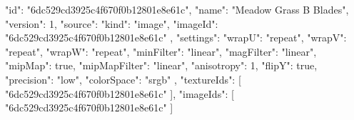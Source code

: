 {
  "id": "6dc529cd3925c4f670f0b12801e8e61c",
  "name": "Meadow Grass B Blades",
  "version": 1,
  "source": {
    "kind": "image",
    "imageId": "6dc529cd3925c4f670f0b12801e8e61c"
  },
  "settings": {
    "wrapU": "repeat",
    "wrapV": "repeat",
    "wrapW": "repeat",
    "minFilter": "linear",
    "magFilter": "linear",
    "mipMap": true,
    "mipMapFilter": "linear",
    "anisotropy": 1,
    "flipY": true,
    "precision": "low",
    "colorSpace": "srgb"
  },
  "textureIds": [
    "6dc529cd3925c4f670f0b12801e8e61c"
  ],
  "imageIds": [
    "6dc529cd3925c4f670f0b12801e8e61c"
  ]
}
